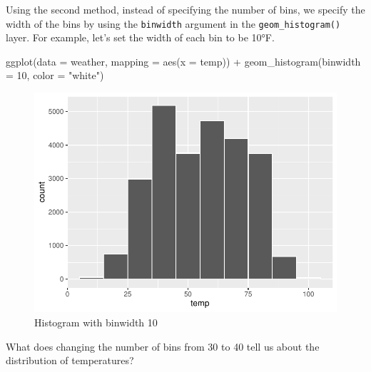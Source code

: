 \documentclass[
  letterpaper,
  DIV=11,
  numbers=noendperiod]{scrreprt}
\newenvironment{Shaded}{\begin{snugshade}}{\end{snugshade}}
\newcommand{\AttributeTok}[1]{\textcolor[rgb]{0.40,0.45,0.13}{#1}}
\newcommand{\DecValTok}[1]{\textcolor[rgb]{0.68,0.00,0.00}{#1}}
\newcommand{\FunctionTok}[1]{\textcolor[rgb]{0.28,0.35,0.67}{#1}}
\newcommand{\NormalTok}[1]{\textcolor[rgb]{0.00,0.23,0.31}{#1}}
\newcommand{\SpecialCharTok}[1]{\textcolor[rgb]{0.37,0.37,0.37}{#1}}
\newcommand{\StringTok}[1]{\textcolor[rgb]{0.13,0.47,0.30}{#1}}
\theoremstyle{definition}
\theoremstyle{remark}
\begin{document}
Using the second method, instead of specifying the number of bins, we
specify the width of the bins by using the \texttt{binwidth} argument in
the \texttt{geom\_histogram()} layer. For example, let's set the width
of each bin to be 10°F.

\begin{Shaded}
\begin{Highlighting}[]
\FunctionTok{ggplot}\NormalTok{(}\AttributeTok{data =}\NormalTok{ weather, }\AttributeTok{mapping =} \FunctionTok{aes}\NormalTok{(}\AttributeTok{x =}\NormalTok{ temp)) }\SpecialCharTok{+}
  \FunctionTok{geom\_histogram}\NormalTok{(}\AttributeTok{binwidth =} \DecValTok{10}\NormalTok{, }\AttributeTok{color =} \StringTok{"white"}\NormalTok{)}
\end{Highlighting}
\end{Shaded}

\begin{figure}[H]

{\centering \includegraphics{02-visualization_files/figure-pdf/fig-hist-binwidth10-1.pdf}

}

\caption{\label{fig-hist-binwidth10}Histogram with binwidth 10}

\end{figure}

\begin{tcolorbox}[enhanced jigsaw, colback=white, toprule=.15mm, bottomrule=.15mm, titlerule=0mm, title={{🎯} Learning Check 2.14}, leftrule=.75mm, arc=.35mm, left=2mm, colframe=quarto-callout-tip-color-frame, coltitle=black, opacitybacktitle=0.6, bottomtitle=1mm, colbacktitle=quarto-callout-tip-color!10!white, opacityback=0, toptitle=1mm, rightrule=.15mm, breakable]

What does changing the number of bins from 30 to 40 tell us about the
distribution of temperatures?

\end{tcolorbox}
\end{document}

